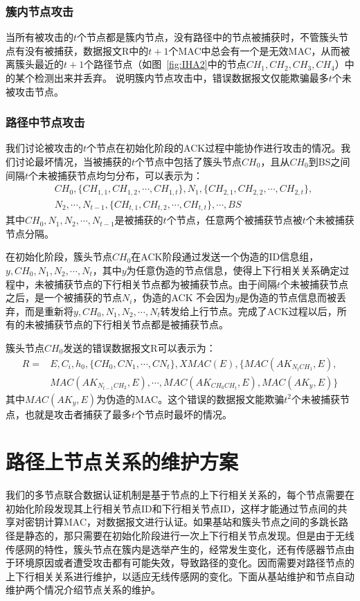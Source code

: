 \subsubsection{簇内节点攻击}
当所有被攻击的$t$个节点都是簇内节点，没有路径中的节点被捕获时，不管簇头节点有没有被捕获，数据报文R中的$t+1$个MAC中总会有一个是无效MAC，从而被离簇头最近的$t+1$个路径节点（如图~\ref{fig:IHA2}中的节点$CH_1,CH_2,CH_3,CH_4$）中的某个检测出来并丢弃。
说明簇内节点攻击中，错误数据报文仅能欺骗最多$t$个未被攻击节点。

\subsubsection{路径中节点攻击}
我们讨论被攻击的$t$个节点在初始化阶段的ACK过程中能协作进行攻击的情况。我们讨论最坏情况，当被捕获的$t$个节点中包括了簇头节点$CH_0$，且从$CH_0$到BS之间间隔$t$个未被捕获节点均匀分布，可以表示为：
\begin{equation}
\begin{split}
  & CH_0,\{CH_{1,1},CH_{1,2},\cdots,CH_{1,t}\},N_1,\{CH_{2,1},CH_{2,2},\cdots,CH_{2,t}\},\\
  & N_2,\cdots,N_{t-1},\{CH_{t,1},CH_{t,2},\cdots,CH_{t,t}\},\cdots,BS
\end{split}
\end{equation}
其中$CH_0,N_1,N_2,\cdots,N_{t-1}$是被捕获的$t$个节点，任意两个被捕获节点被$t$个未被捕获节点分隔。

在初始化阶段，簇头节点$CH_0$在ACK阶段通过发送一个伪造的ID信息组，$y,CH_0,N_1,N_2,\cdots,N_t$，其中$y$为任意伪造的节点信息，使得上下行相关关系确定过程中，未被捕获节点的下行相关节点都为被捕获节点。由于间隔$t$个未被捕获节点之后，是一个被捕获的节点$N_i$，伪造的ACK 不会因为$y$是伪造的节点信息而被丢弃，而是重新将$y,CH_0,N_1,N_2,\cdots,N_t$转发给上行节点。完成了ACK过程以后，所有的未被捕获节点的下行相关节点都是被捕获节点。

簇头节点$CH_0$发送的错误数据报文R可以表示为：
\begin{equation}\label{report}
\begin{split}
  R=
  & E,C_i,h_0,\{CH_0,CN_1,\cdots,CN_t\},XMAC(E),\{MAC(AK_{N_t CH_1},E),\\
  & MAC(AK_{N_{t-1} CH_2},E),\cdots,MAC(AK_{CH_0 CH_t},E),MAC(AK_y,E)\}
\end{split}
\end{equation}
其中$MAC(AK_y,E)$为伪造的MAC。这个错误的数据报文能欺骗$t^2$个未被捕获节点，也就是攻击者捕获了最多$t$个节点时最坏的情况。
\section{路径上节点关系的维护方案}
我们的多节点联合数据认证机制是基于节点的上下行相关关系的，每个节点需要在初始化阶段发现其上行相关节点ID和下行相关节点ID，这样才能通过节点间的共享对密钥计算MAC，对数据报文进行认证。如果基站和簇头节点之间的多跳长路径是静态的，那只需要在初始化阶段进行一次上下行相关节点发现。但是由于无线传感网的特性，簇头节点在簇内是选举产生的，经常发生变化，还有传感器节点由于环境原因或者遭受攻击都有可能失效，导致路径的变化。因而需要对路径节点的上下行相关关系进行维护，以适应无线传感网的变化。下面从基站维护和节点自动维护两个情况介绍节点关系的维护。
